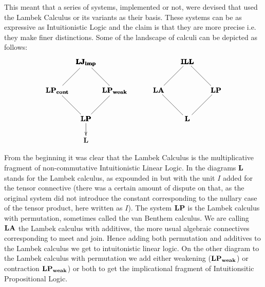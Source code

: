 \documentclass{lmcs}
\begin{document}

This meant that a series of systems, implemented or not, were devised
that used the Lambek Calculus or its variants as their basis. These
systems can be as expressive as Intuitionistic Logic and the claim is
that they are more precise i.e. they make finer distinctions. Some of
the landscape of calculi can be depicted as follows:
\[
\begin{array}{cccc}
  \bfig
  \Ctriangle/-``-/<400,400>[
    \textbf{LJ}_{\textbf{imp}}`
    \textbf{LP}_{\textbf{cont}}`
    \textbf{LP};``]

  \Dtriangle(400,0)/`-`-/<400,400>[
    \textbf{LJ}_{\textbf{imp}}`
    \textbf{LP}_{\textbf{weak}}`
    \textbf{LP};``]

  \morphism(400,0)<0,-300>[\textbf{LP}`\textbf{L};]
  \efig
  & \quad &
  \bfig
  \Ctriangle/-``-/<400,400>[
    \textbf{ILL}`
    \textbf{LA}`
    \textbf{L};``]

  \Dtriangle(400,0)/`-`-/<400,400>[
    \textbf{ILL}`
    \textbf{LP}`
    \textbf{L};``]
  \morphism(400,0)//<0,-300>[`;]
  \efig
\end{array}
\]

From the beginning it was clear that the Lambek Calculus is the
multiplicative fragment of non-commutative Intuitionistic Linear
Logic. In the diagrams $\bf L$ stands for the Lambek calculus, as
expounded in \cite{Lambek1958} but with the unit $I$ added for the
tensor connective (there was a certain amount of dispute on that, as
the original system did not introduce the constant corresponding to
the nullary case of the tensor product, here written as $I$). The
system $\bf{LP}$ is the Lambek calculus with permutation, sometimes
called the van Benthem calculus. We are calling $\bf{LA}$ the Lambek
calculus with additives, the more usual algebraic connectives
corresponding to meet and join. Hence adding both permutation and
additives to the Lambek calculus we get to intuitonistic linear
logic. On the other diagram to the Lambek calculus with permutation we
add either weakening ($\bf{LP_{weak}}$) or contraction
$\bf{LP_{weak}}$) or both to get the implicational fragment of
Intuitionsitic Propositional Logic.
\end{document}
